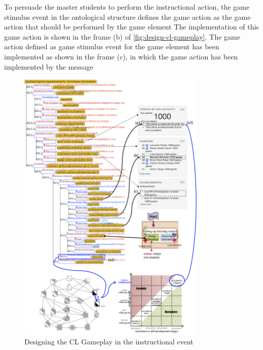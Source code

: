 To persuade the master students to perform the instructional action, the game stimulus event in the ontological structure defines the game action  as the game action that should be performed by the game element  The implementation of this game action is shown in the frame (b) of \autoref{fig:design-cl-gameplay}. The game action  defined as game stimulus event for the game element  has been implemented as shown in the frame (c), in which the game action has been implemented by the message 

\newpage
\begin{figure}[htb]
 \caption{Designing the CL Gameplay in the instructional event }
 \label{fig:design-cl-gameplay}
 \centering
 \includegraphics[width=0.8\textwidth]{images/chap-mechanisms-procedures/design-cl-gameplay.png}
 \fautor
\end{figure}

